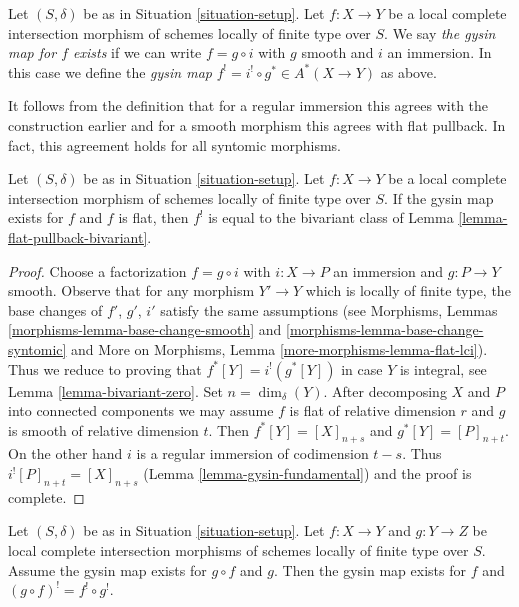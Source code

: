 \begin{definition}
\label{definition-lci-gysin}
Let $(S, \delta)$ be as in Situation \ref{situation-setup}.
Let $f : X \to Y$ be a local complete intersection morphism
of schemes locally of finite type over $S$. We say
{\it the gysin map for $f$ exists} if we can write
$f = g \circ i$ with $g$ smooth and $i$ an immersion.
In this case we define the
{\it gysin map} $f^! = i^! \circ g^* \in A^*(X \to Y)$ as above.
\end{definition}

\noindent
It follows from the definition that for a regular immersion
this agrees with the construction earlier and for a smooth
morphism this agrees with flat pullback. In fact, this agreement
holds for all syntomic morphisms.

\begin{lemma}
\label{lemma-lci-gysin-flat}
Let $(S, \delta)$ be as in Situation \ref{situation-setup}.
Let $f : X \to Y$ be a local complete intersection morphism
of schemes locally of finite type over $S$. If the gysin map
exists for $f$ and $f$ is flat, then $f^!$ is equal to the
bivariant class of Lemma \ref{lemma-flat-pullback-bivariant}.
\end{lemma}

\begin{proof}
Choose a factorization $f = g \circ i$ with $i : X \to P$
an immersion and $g : P \to Y$ smooth. Observe that for
any morphism $Y' \to Y$ which is locally of finite type,
the base changes of $f'$, $g'$, $i'$ satisfy the same
assumptions (see Morphisms, Lemmas \ref{morphisms-lemma-base-change-smooth}
and \ref{morphisms-lemma-base-change-syntomic} and
More on Morphisms, Lemma \ref{more-morphisms-lemma-flat-lci}).
Thus we reduce to proving that $f^*[Y] = i^!(g^*[Y])$ in case $Y$
is integral, see Lemma \ref{lemma-bivariant-zero}. Set $n = \dim_\delta(Y)$.
After decomposing $X$ and $P$ into connected components we
may assume $f$ is flat of relative dimension $r$ and
$g$ is smooth of relative dimension $t$.
Then $f^*[Y] = [X]_{n + s}$ and $g^*[Y] = [P]_{n + t}$.
On the other hand $i$ is a regular immersion of codimension $t - s$.
Thus $i^![P]_{n + t} = [X]_{n + s}$ (Lemma \ref{lemma-gysin-fundamental})
and the proof is complete.
\end{proof}

\begin{lemma}
\label{lemma-lci-gysin-composition}
Let $(S, \delta)$ be as in Situation \ref{situation-setup}.
Let $f : X \to Y$ and $g : Y \to Z$ be local complete intersection morphisms
of schemes locally of finite type over $S$. Assume the gysin
map exists for $g \circ f$ and $g$. Then the gysin map exists for $f$
and $(g \circ f)^! = f^! \circ g^!$.
\end{lemma}

